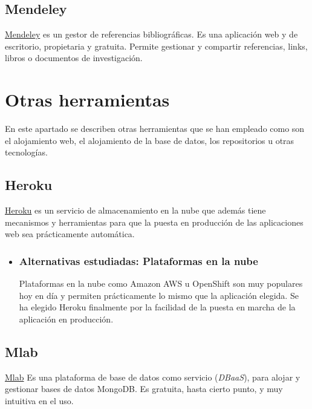  \subsection{Mendeley}\label{docs_mendeley}
  \hyperlink{www.mendeley.com/}{Mendeley} es un gestor de referencias bibliográficas. Es una aplicación web y de escritorio, propietaria y gratuita. Permite gestionar y compartir referencias, links, libros o documentos de investigación.
  
  \section{Otras herramientas}\label{otrasherramientas}
En este apartado se describen otras herramientas que se han empleado como son el alojamiento web, el alojamiento de la base de datos, los repositorios u otras tecnologías.

 \subsection{Heroku}\label{otrasherramientas_heroku}
\hyperlink{https://www.heroku.com/}{Heroku}  es un servicio de almacenamiento en la nube que además tiene mecanismos y herramientas para que la puesta en producción de las aplicaciones web sea prácticamente automática.

 \begin{itemize}
 	\item 	 \subsubsection{Alternativas estudiadas: Plataformas en la nube}\label{tnube}
  Plataformas en la nube como Amazon AWS u OpenShift son muy populares hoy en día y permiten prácticamente lo mismo que la aplicación elegida. Se ha elegido Heroku finalmente por la facilidad de la puesta en marcha de la aplicación en producción.
\end{itemize}



  
 \subsection{Mlab}\label{otrasherramientas_mlab}
 \hyperlink{https://mlab.com/}{Mlab} Es una plataforma de base de datos como servicio (\emph{DBaaS}), para alojar y gestionar bases de datos MongoDB. Es gratuita, hasta cierto punto, y muy intuitiva en el uso.


